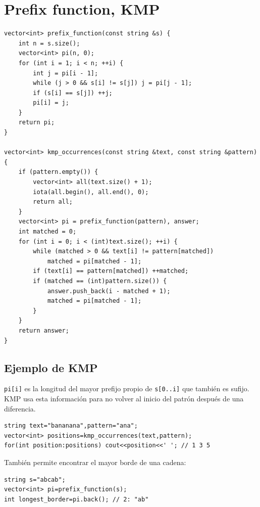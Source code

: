 \section{Prefix function, KMP}

\begin{lstlisting}[style=cpp]
vector<int> prefix_function(const string &s) {
    int n = s.size();
    vector<int> pi(n, 0);
    for (int i = 1; i < n; ++i) {
        int j = pi[i - 1];
        while (j > 0 && s[i] != s[j]) j = pi[j - 1];
        if (s[i] == s[j]) ++j;
        pi[i] = j;
    }
    return pi;
}

vector<int> kmp_occurrences(const string &text, const string &pattern) {
    if (pattern.empty()) {
        vector<int> all(text.size() + 1);
        iota(all.begin(), all.end(), 0);
        return all;
    }
    vector<int> pi = prefix_function(pattern), answer;
    int matched = 0;
    for (int i = 0; i < (int)text.size(); ++i) {
        while (matched > 0 && text[i] != pattern[matched])
            matched = pi[matched - 1];
        if (text[i] == pattern[matched]) ++matched;
        if (matched == (int)pattern.size()) {
            answer.push_back(i - matched + 1);
            matched = pi[matched - 1];
        }
    }
    return answer;
}
\end{lstlisting}

\subsection{Ejemplo de KMP}

\texttt{pi[i]} es la longitud del mayor prefijo propio de
\texttt{s[0..i]} que también es sufijo. KMP usa esta información para no volver
al inicio del patrón después de una diferencia.

\begin{lstlisting}[style=cpp]
string text="bananana",pattern="ana";
vector<int> positions=kmp_occurrences(text,pattern);
for(int position:positions) cout<<position<<' '; // 1 3 5
\end{lstlisting}

También permite encontrar el mayor borde de una cadena:

\begin{lstlisting}[style=cpp]
string s="abcab";
vector<int> pi=prefix_function(s);
int longest_border=pi.back(); // 2: "ab"
\end{lstlisting}

